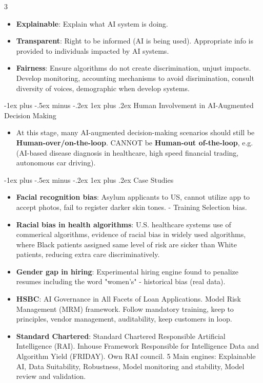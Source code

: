 \documentclass[10pt, landscape]{article}
\makeatletter
\renewcommand{\subsubsection}{\@startsection{subsubsection}{3}{0mm}%
                                {-1ex plus -.5ex minus -.2ex}%
                                {1ex plus .2ex}%
                                {\normalfont\small\bfseries}}
\makeatother
\begin{document}
\begin{multicols*}{3}
\begin{itemize}[itemsep=0pt]
	\begin{itemize}[itemsep=0pt, topsep=0pt]
	\item \textbf{Explainable}: Explain what AI system is doing.
	\item \textbf{Transparent}: Right to be informed (AI is being used). Appropriate info is provided to individuals impacted by AI systems.
	\item \textbf{Fairness}: Ensure algorithms do not create discrimination, unjust impacts. Develop monitoring, accounting mechanisms to avoid disrimination, consult diversity of voices, demographic when develop systems.
	\end{itemize}
\end{itemize}
        

\subsubsection{Human Involvement in AI-Augmented Decision Making}
\begin{itemize}
\item At this stage, many AI-augmented decision-making scenarios should still be \textbf{Human-over/on-the-loop}. CANNOT be \textbf{Human-out of-the-loop}, e.g. (AI-based disease diagnosis in healthcare, high speed financial trading, autonomous car driving).
\end{itemize}

\subsubsection{Case Studies}
\begin{itemize}[itemsep=0pt]
\item \textbf{Facial recognition bias}: Asylum applicants to US, cannot utilize app to accept photos, fail to register darker skin tones. - Training Selection bias.
\item \textbf{Racial bias in health algorithms}: U.S. healthcare systems use of commerical algorithms, evidence of racial bias in widely used algorithms, where Black patients assigned same level of risk are sicker than White patients, reducing extra care discriminatively.
\item \textbf{Gender gap in hiring}: Experimental hiring engine found to penalize resumes including the word "women's" - historical bias (real data).
\item \textbf{HSBC}: AI Governance in All Facets of Loan Applications. Model Risk Management (MRM) framework. Follow mandatory training, keep to principles, vendor management, auditability, keep customers in loop. 
\item \textbf{Standard Chartered}: Standard Chartered Responsible Artificial Intelligence (RAI). Inhouse Framework Responsible for Intelligence Data and Algorithm Yield (FRIDAY). Own RAI council. 5 Main engines: Explainable AI, Data Suitability, Robustness, Model monitoring and stability, Model review and validation.
\end{itemize}


\end{multicols*}
\end{document}
